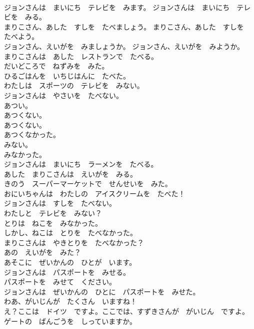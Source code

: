 \documentclass[8pt]{extreport}
\begin{document}
\begin{CJK}{UTF8}{min}
\\	ジョンさんは　まいにち　テレビを　みます。 ジョンさんは　まいにち　テレビを　みる。	
\\	まりこさん、あした　すしを　たべましょう。 まりこさん、あした　すしを　たべよう。	
\\	ジョンさん、えいがを　みましょうか。 ジョンさん、えいがを　みようか。	
\\	まりこさんは　あした　レストランで　たべる。	
\\	だいどころで　ねずみを　みた。	
\\	ひるごはんを　いちじはんに　たべた。	
\\	わたしは　スポーツの　テレビを　みない。	
\\	ジョンさんは　やさいを　たべない。	
\\	あつい。	
\\	あつくない。	
\\	あつくない。	
\\	あつくなかった。	
\\	みない。	
\\	みなかった。	
\\	ジョンさんは　まいにち　ラーメンを　たべる。	
\\	あした　まりこさんは　えいがを　みる。	
\\	きのう　スーパーマーケットで　せんせいを　みた。	
\\	おにいちゃんは　わたしの　アイスクリームを　たべた！	
\\	ジョンさんは　すしを　たべない。	
\\	わたしと　テレビを　みない？	
\\	とりは　ねこを　みなかった。	
\\	しかし、ねこは　とりを　たべなかった。	
\\	まりこさんは　やきとりを　たべなかった？	
\\	あの　えいがを　みた？	
\\	あそこに　ぜいかんの　ひとが　います。	
\\	ジョンさんは　パスポートを　みせる。	
\\	パスポートを　みせて　ください。	
\\	ジョンさんは　ぜいかんの　ひとに　パスポートを　みせた。	
\\	わあ、がいじんが　たくさん　いますね！	
\\	え？ここは　ドイツ　ですよ。ここでは、すずきさんが　がいじん　ですよ。	
\\	ゲートの　ばんごうを　しっていますか。	

\end{CJK}
\end{document}
